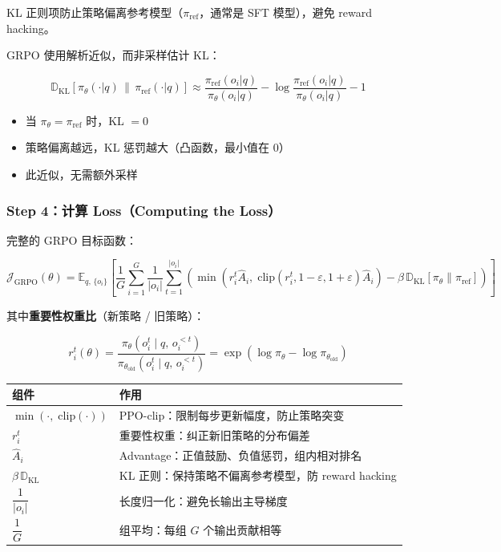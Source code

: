 KL 正则项防止策略偏离参考模型（$\pi_\text{ref}$，通常是 SFT 模型），避免 reward hacking。

GRPO 使用解析近似，而非采样估计 KL：

\[
\mathbb{D}_\text{KL}\!\left[\pi_\theta(\cdot|q) \,\big\|\, \pi_\text{ref}(\cdot|q)\right] \approx \frac{\pi_\text{ref}(o_i|q)}{\pi_\theta(o_i|q)} - \log\frac{\pi_\text{ref}(o_i|q)}{\pi_\theta(o_i|q)} - 1
\]

\begin{itemize}[leftmargin=1.5em]
  \item 当 $\pi_\theta = \pi_\text{ref}$ 时，KL $= 0$
  \item 策略偏离越远，KL 惩罚越大（凸函数，最小值在 0）
  \item 此近似，无需额外采样
\end{itemize}

\subsubsection{Step 4：计算 Loss（Computing the Loss）}

完整的 GRPO 目标函数：

\[
\mathcal{J}_\text{GRPO}(\theta) = \mathbb{E}_{q,\,\{o_i\}}\!\left[\frac{1}{G}\sum_{i=1}^G \frac{1}{|o_i|}\sum_{t=1}^{|o_i|} \left(\min\!\left(r_i^t\hat{A}_i,\;\mathrm{clip}(r_i^t,1{-}\varepsilon,1{+}\varepsilon)\hat{A}_i\right) - \beta\,\mathbb{D}_\text{KL}[\pi_\theta\|\pi_\text{ref}]\right)\right]
\]

其中\textbf{重要性权重比}（新策略 / 旧策略）：

\[
r_i^t(\theta) = \frac{\pi_\theta(o_i^t \mid q,\, o_i^{<t})}{\pi_{\theta_\text{old}}(o_i^t \mid q,\, o_i^{<t})} = \exp\!\left(\log\pi_\theta - \log\pi_{\theta_\text{old}}\right)
\]

\begin{center}
{\small
\begin{tabular}{p{4.5cm}p{9cm}}
\hline
\textbf{组件} & \textbf{作用} \\
\hline
$\min(\cdot,\;\mathrm{clip}(\cdot))$ & PPO-clip：限制每步更新幅度，防止策略突变 \\
$r_i^t$ & 重要性权重：纠正新旧策略的分布偏差 \\
$\hat{A}_i$ & Advantage：正值鼓励、负值惩罚，组内相对排名 \\
$\beta\,\mathbb{D}_\text{KL}$ & KL 正则：保持策略不偏离参考模型，防 reward hacking \\
$\dfrac{1}{|o_i|}$ & 长度归一化：避免长输出主导梯度 \\
$\dfrac{1}{G}$ & 组平均：每组 $G$ 个输出贡献相等 \\
\hline
\end{tabular}
}
\end{center}

